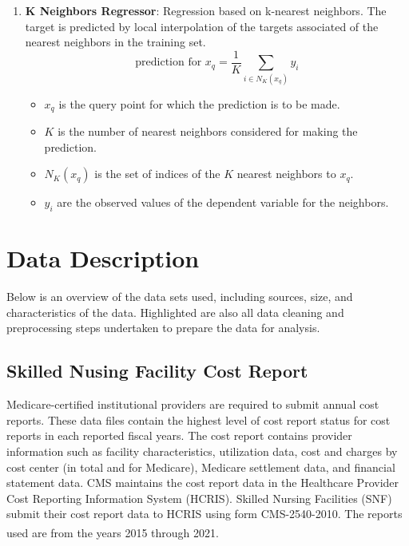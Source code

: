 \documentclass{article}
\theoremstyle{mytheoremstyle}
\theoremstyle{mytheoremstyle}
\theoremstyle{myproblemstyle}
\begin{document}
\begin{enumerate}
    \item \textbf{K Neighbors Regressor}: Regression based on k-nearest neighbors. The target is predicted by local interpolation of the targets associated of the nearest neighbors in the training set.
        \[
\text{prediction for } x_q = \frac{1}{K} \sum_{i \in N_K(x_q)} y_i
\]
\begin{itemize}
    \item $x_q$ is the query point for which the prediction is to be made.
    \item $K$ is the number of nearest neighbors considered for making the prediction.
    \item $N_K(x_q)$ is the set of indices of the $K$ nearest neighbors to $x_q$.
    \item $y_i$ are the observed values of the dependent variable for the neighbors.
\end{itemize}
\end{enumerate}


\pagebreak
\section{Data Description}

Below is an overview of the data sets used, including sources, size, and characteristics of the data. Highlighted are also all data cleaning and preprocessing steps undertaken to prepare the data for analysis.



\subsection{Skilled Nusing Facility Cost Report}

Medicare-certified institutional providers are required to submit annual cost reports. These data files contain the highest level of cost report status for cost reports in each reported fiscal years. The cost report contains provider information such as facility characteristics, utilization data, cost and charges by cost center (in total and for Medicare), Medicare settlement data, and financial statement data. CMS maintains the cost report data in the Healthcare Provider Cost Reporting Information System (HCRIS). Skilled Nursing Facilities (SNF) submit their cost report data to HCRIS using form CMS-2540-2010. The reports used are from the years 2015 through 2021.\textsuperscript{\cite{cms2023}}
\end{document}

